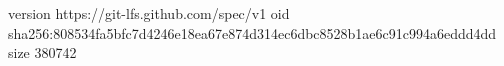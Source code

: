 version https://git-lfs.github.com/spec/v1
oid sha256:808534fa5bfc7d4246e18ea67e874d314ec6dbc8528b1ae6c91c994a6eddd4dd
size 380742
